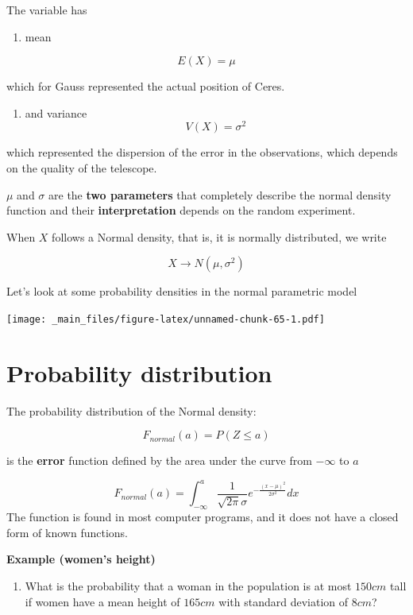 \documentclass[
]{book}
\providecommand{\tightlist}{%
  \setlength{\itemsep}{0pt}\setlength{\parskip}{0pt}}
\begin{document}
The variable has

\begin{enumerate}
\def\labelenumi{\arabic{enumi})}
\tightlist
\item
  mean
\end{enumerate}

\[E(X) = \mu\]

which for Gauss represented the actual position of Ceres.

\begin{enumerate}
\def\labelenumi{\arabic{enumi})}
\setcounter{enumi}{1}
\tightlist
\item
  and variance
  \[V(X) = \sigma^2\]
\end{enumerate}

which represented the dispersion of the error in the observations, which depends on the quality of the telescope.

\(\mu\) and \(\sigma\) are the \textbf{two parameters} that completely describe the normal density function and their \textbf{interpretation} depends on the random experiment.

When \(X\) follows a Normal density, that is, it is normally distributed, we write

\[X\rightarrow N(\mu,\sigma^2)\]

Let's look at some probability densities in the normal parametric model

\texttt{[image: \_main\_files/figure-latex/unnamed-chunk-65-1.pdf]}

\hypertarget{probability-distribution-2}{%
\section{Probability distribution}\label{probability-distribution-2}}

The probability distribution of the Normal density:

\[F_{normal}(a)=P(Z \leq a)\]

is the \textbf{error} function defined by the area under the curve from \(-\infty\) to \(a\)

\[F_{normal}(a)=\int_{-\infty}^{a}\frac{1}{\sqrt{2\pi}\sigma}e^{-\frac{(x-\mu)^2}{2\sigma^2}} dx\]
The function is found in most computer programs, and it does not have a closed form of known functions.

\textbf{Example (women's height)}

\begin{enumerate}
\def\labelenumi{\arabic{enumi})}
\tightlist
\item
  What is the probability that a woman in the population is at most \(150cm\) tall if women have a mean height of \(165cm\) with standard deviation of \(8cm\)?
\end{enumerate}
\end{document}
